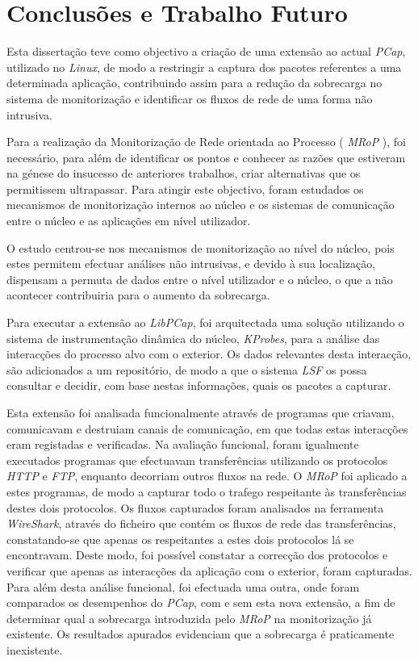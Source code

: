 \chapter{Conclusões e Trabalho Futuro}
\label{cap:conclusao}

Esta dissertação teve como objectivo a criação de uma extensão ao actual \textit{PCap}, utilizado no \textit{Linux}, de modo a restringir a captura dos pacotes referentes a uma determinada aplicação, contribuindo assim para a redução da sobrecarga no sistema de monitorização e identificar os fluxos de rede de uma forma não intrusiva.

Para a realização da Monitorização de Rede orientada ao Processo ( \textit{MRoP} ), foi necessário, para além de identificar os pontos e conhecer as razões que estiveram na génese do insucesso de anteriores trabalhos, criar alternativas que os permitissem ultrapassar.
Para atingir este objectivo, foram estudados os mecanismos de monitorização internos ao núcleo e os sistemas de comunicação entre o núcleo e as aplicações em nível utilizador.

O estudo centrou-se nos mecanismos de monitorização ao nível do núcleo, pois estes permitem efectuar análises não intrusivas, e devido à sua localização, dispensam a permuta de dados entre o nível utilizador e o núcleo, o que a não acontecer contribuiria para o aumento da sobrecarga.

Para executar a extensão ao \textit{LibPCap}, foi arquitectada uma solução utilizando o sistema de instrumentação dinâmica do núcleo, \textit{KProbes}, para a análise das interacções do processo alvo com o exterior.
Os dados relevantes desta interacção, são adicionados a um repositório, de modo a que o sistema \textit{LSF} os possa consultar e decidir, com base nestas informações, quais os pacotes a capturar.

Esta extensão foi analisada funcionalmente através de programas que criavam, comunicavam e destruiam canais de comunicação, em que todas estas interacções eram registadas e verificadas.
Na avaliação funcional, foram igualmente executados programas que efectuavam transferências utilizando os protocolos \textit{HTTP} e \textit{FTP}, enquanto decorriam outros fluxos na rede. 
O \textit{MRoP} foi aplicado a estes programas, de modo a capturar todo o trafego respeitante às transferências destes dois protocolos.
Os fluxos capturados foram analisados na ferramenta \textit{WireShark}, através do ficheiro que contém os fluxos de rede das transferências, constatando-se que apenas os respeitantes a estes dois protocolos lá se encontravam.
Deste modo, foi possível constatar a correcção dos protocolos e verificar que apenas as interacções da aplicação com o exterior, foram capturadas.
Para além desta análise funcional, foi efectuada uma outra, onde foram comparados os desempenhos do \textit{PCap}, com e sem esta nova extensão, a fim de determinar qual a sobrecarga introduzida pelo \textit{MRoP} na monitorização já existente.
Os resultados apurados evidenciam que a sobrecarga é praticamente inexistente.

